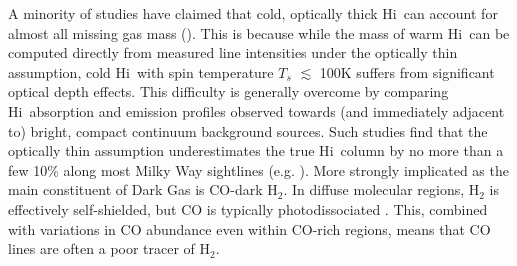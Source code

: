 \documentclass[preprint]{emulateapj}
\def\h2{H$_2$}
\def\hi{H{\sc i}}
\def\xco{$X_\mathrm{CO}$}
\begin{document}
A minority of studies have claimed that cold, optically thick \hi\ can account for almost all missing gas mass (\citealt{Fukui2015}). This is because while the mass of warm \hi\ can be computed directly from measured line intensities under the optically thin assumption, cold \hi\ with spin temperature $T_{s}$ $\lesssim$ 100K suffers from significant optical depth effects. This difficulty is generally overcome by comparing \hi\ absorption and emission profiles observed towards (and immediately adjacent to) bright, compact continuum background sources. Such studies find that %
the optically thin assumption underestimates the true \hi\ column by no more than a few 10\% along most Milky Way sightlines (e.g. \citealt{Dickey1983,Dickey2000,Dickey2003,Heiles2003a,Heiles2003b,Liszt2014,Lee2015}). More strongly implicated as the main constituent of Dark Gas is CO-dark \h2. In diffuse molecular regions, \h2 is effectively self-shielded, %
but CO is typically photodissociated \citep{Tielens1985a,Tielens1985b,vanDishoeck1988,Wolfire2010,Glover2011,Lee2015,Glover2016}. %
This, combined with variations in CO abundance even within CO-rich regions, means that CO lines are often a poor tracer of \h2. 
\end{document}
